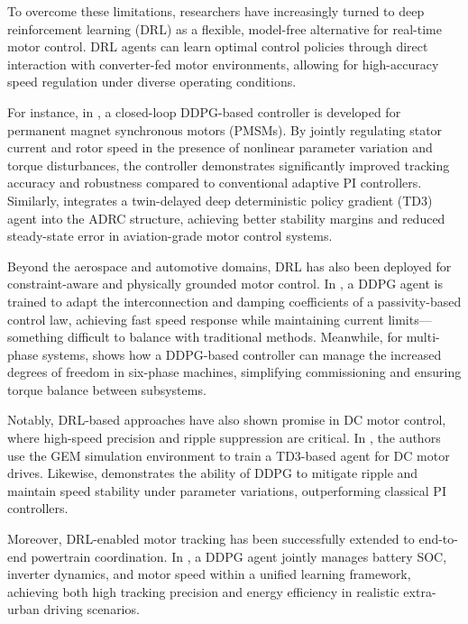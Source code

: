 To overcome these limitations, researchers have increasingly turned to deep reinforcement learning (DRL) as a flexible, model-free alternative for real-time motor control. DRL agents can learn optimal control policies through direct interaction with converter-fed motor environments, allowing for high-accuracy speed regulation under diverse operating conditions.

For instance, in \cite{bhattacharjee2022real}, a closed-loop DDPG-based controller is developed for permanent magnet synchronous motors (PMSMs). By jointly regulating stator current and rotor speed in the presence of nonlinear parameter variation and torque disturbances, the controller demonstrates significantly improved tracking accuracy and robustness compared to conventional adaptive PI controllers. Similarly, \cite{wang2023novel} integrates a twin-delayed deep deterministic policy gradient (TD3) agent into the ADRC structure, achieving better stability margins and reduced steady-state error in aviation-grade motor control systems.

Beyond the aerospace and automotive domains, DRL has also been deployed for constraint-aware and physically grounded motor control. In \cite{wang2024current}, a DDPG agent is trained to adapt the interconnection and damping coefficients of a passivity-based control law, achieving fast speed response while maintaining current limits—something difficult to balance with traditional methods. Meanwhile, for multi-phase systems, \cite{broghammer2023reinforcement} shows how a DDPG-based controller can manage the increased degrees of freedom in six-phase machines, simplifying commissioning and ensuring torque balance between subsystems.

Notably, DRL-based approaches have also shown promise in DC motor control, where high-speed precision and ripple suppression are critical. In \cite{cosmin2023reinforcement}, the authors use the GEM simulation environment to train a TD3-based agent for DC motor drives. Likewise, \cite{anugula2021deep} demonstrates the ability of DDPG to mitigate ripple and maintain speed stability under parameter variations, outperforming classical PI controllers.

Moreover, DRL-enabled motor tracking has been successfully extended to end-to-end powertrain coordination. In \cite{basile2024sustainable}, a DDPG agent jointly manages battery SOC, inverter dynamics, and motor speed within a unified learning framework, achieving both high tracking precision and energy efficiency in realistic extra-urban driving scenarios.

